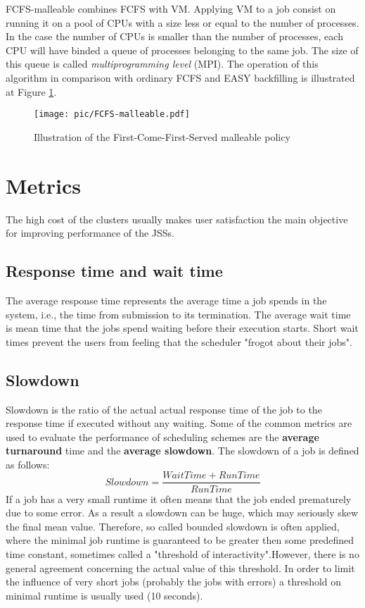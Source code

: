 \documentclass[a4paper,10pt]{article}
\begin{document}
FCFS-malleable combines FCFS with VM. Applying VM to a job consist on running it on a pool of CPUs with a size less or equal to the number of processes. In the case the number of CPUs is smaller than the number of processes, each CPU will have binded a queue of processes belonging to the same job. The size of this queue is called \textit{multiprogramming level} (MPI).\cite{FCFS-malleable} The operation of this algorithm in comparison with ordinary FCFS and EASY backfilling is illustrated at Figure \ref{FCFS-malleable-figure}. 

\begin{figure}
\begin{center}
\texttt{[image: pic/FCFS-malleable.pdf]}
\caption{Illustration of the First-Come-First-Served malleable policy\cite{FCFS-malleable}}
\label{FCFS-malleable-figure}
\end{center}
\end{figure}


\section{Metrics}
The high cost of the clusters usually makes user satisfaction the main objective for improving performance of the JSSs.\cite{FCFS-malleable}
\subsection{Response time and wait time}
The average response time represents the average time a job spends in the system, i.e., the time from submission to its termination. 
The average wait time is mean time that the jobs spend waiting before their execution starts. Short wait times prevent the users from feeling that the scheduler "frogot about their jobs".\cite{Rudova 2012} 
\subsection{Slowdown}
Slowdown is the ratio of the actual actual response time of the job to the response time if executed without any waiting.\cite{Rudova 2012} 
Some of the common metrics are used to evaluate the performance of scheduling schemes are the \textbf{average turnaround} time and the \textbf{average slowdown}. The slowdown of a job is defined as follows:
\begin{equation}
Slowdown = \frac{WaitTime+RunTime}{RunTime}
\label{slowdown}
\end{equation}
If a job has a very small runtime it often means that the job ended prematurely due to some error. As a result a slowdown can be huge, which may seriously skew the final mean value. Therefore, so called bounded slowdown is often applied, where the minimal job runtime is guaranteed to be greater then some predefined time constant, sometimes called a "threshold of interactivity".However, there is no  general agreement concerning the actual value of this threshold.
In order to limit the influence of very short jobs (probably the jobs with errors) a threshold on minimal runtime is usually used (10 seconds).
\end{document}
